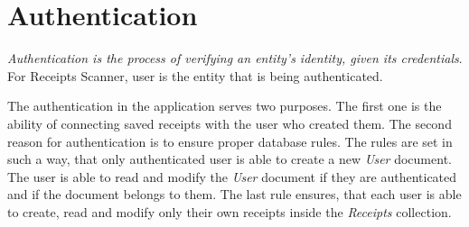 \documentclass[
  digital, %
  table,   %
  oneside, %
  lof,     %
  lot,     %
]{fithesis3}
\begin{document}
\section{Authentication}
\textit{Authentication is the process of verifying an entity’s identity, given its credentials}\cite{Cankaya2011Authentication}.
For Receipts Scanner, user is the entity that is being authenticated.

The authentication in the application serves two purposes. The first one is the ability of connecting saved receipts with the user who created them. The second reason for authentication is to ensure proper database rules. The rules are set in such a way, that only authenticated user is able to create a new \textit{User} document. The user is able to read and modify the \textit{User} document if they are authenticated and if the document belongs to them. The last rule ensures, that each user is able to create, read and modify only their own receipts inside the \textit{Receipts} collection.
\end{document}
